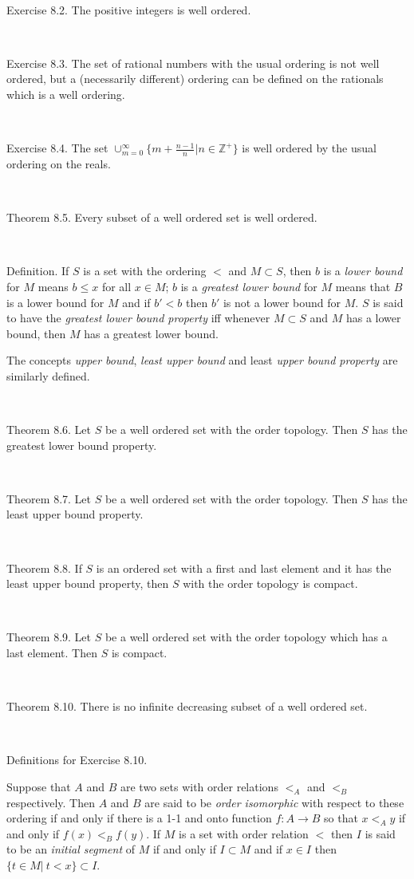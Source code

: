 \documentclass[12pt, std]{article}
\begin{document}
\

Exercise 8.2.  The positive integers is well ordered.

\

Exercise 8.3.  The set of rational numbers with the usual ordering
is not well ordered, but a (necessarily different) ordering can be
defined on the rationals which is a well ordering.

\

Exercise 8.4.  The set $\cup_{m=0}^{\infty} \{ m + \frac {n-1}{n} |
n \in \mathbb{Z}^+ \}$ is well ordered by the usual ordering on the
reals.

\

Theorem 8.5.  Every subset of a well ordered set is well ordered.

\

Definition.  If $S$ is a set with the ordering $<$ and $M \subset S$, then $b$ is a \textit{lower bound} for $M$ means $b \le x$ for all $x \in M$; $b$ is a \textit{greatest lower bound} for $M$ means that $B$ is a lower bound for $M$ and if $b' < b$ then $b'$ is not a lower bound for $M$.  $S$ is said to have the \textit{greatest lower bound property} iff whenever $M \subset S$ and $M$ has a lower bound, then $M$ has a greatest lower bound.

The concepts \textit{upper bound}, \textit{least upper bound} and least \textit{upper bound property} are similarly defined.

\

Theorem 8.6.  Let $S$ be a well ordered set with the order topology.
Then $S$ has the greatest lower bound property.

\

Theorem 8.7.  Let $S$ be a well ordered set with the order topology.
Then $S$ has the least upper bound property.

\

Theorem 8.8.  If $S$ is an ordered set with a first and last element and it has the least upper bound property, then $S$ with the order topology is compact.

\

Theorem 8.9.  Let $S$ be a well ordered set with the order
topology which has a last element.  Then $S$ is compact.

\

Theorem 8.10.  There is no infinite decreasing subset of a well
ordered set.

\

Definitions for Exercise 8.10.

Suppose that $A$ and $B$ are two sets with order relations $<_A$ and
$<_B$ respectively.  Then $A$ and $B$ are said to be \textit{order
isomorphic} with respect to these ordering if and only if there is a
1-1 and onto function $f: A \rightarrow B$ so that $x <_A y$ if and
only if $f(x) <_B f(y)$.  If $M$ is a set with order relation $<$
then $I$ is said to be an \textit{initial segment} of $M$ if and
only if $I \subset M$ and if $x \in I$ then $\{ t \in M | \ t< x \}
\subset I$.
\end{document}
